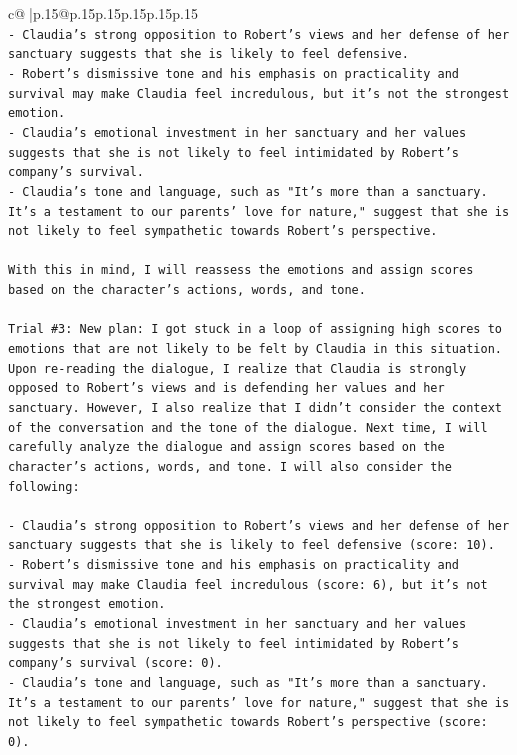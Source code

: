 \documentclass{article}
\begin{document}
{\begin{supertabular}{c@{$\;$}|p{.15\linewidth}@{}p{.15\linewidth}p{.15\linewidth}p{.15\linewidth}p{.15\linewidth}p{.15\linewidth}}
{{{\\ 
\texttt{{-} Claudia's strong opposition to Robert's views and her defense of her sanctuary suggests that she is likely to feel defensive.} \\
\texttt{{-} Robert's dismissive tone and his emphasis on practicality and survival may make Claudia feel incredulous, but it's not the strongest emotion.} \\
\texttt{{-} Claudia's emotional investment in her sanctuary and her values suggests that she is not likely to feel intimidated by Robert's company's survival.} \\
\texttt{{-} Claudia's tone and language, such as "It's more than a sanctuary. It's a testament to our parents' love for nature," suggest that she is not likely to feel sympathetic towards Robert's perspective.} \\
\\ 
\texttt{With this in mind, I will reassess the emotions and assign scores based on the character's actions, words, and tone.} \\
\\ 
\texttt{Trial \#3: New plan: I got stuck in a loop of assigning high scores to emotions that are not likely to be felt by Claudia in this situation. Upon re{-}reading the dialogue, I realize that Claudia is strongly opposed to Robert's views and is defending her values and her sanctuary. However, I also realize that I didn't consider the context of the conversation and the tone of the dialogue. Next time, I will carefully analyze the dialogue and assign scores based on the character's actions, words, and tone. I will also consider the following:} \\
\\ 
\texttt{{-} Claudia's strong opposition to Robert's views and her defense of her sanctuary suggests that she is likely to feel defensive (score: 10).} \\
\texttt{{-} Robert's dismissive tone and his emphasis on practicality and survival may make Claudia feel incredulous (score: 6), but it's not the strongest emotion.} \\
\texttt{{-} Claudia's emotional investment in her sanctuary and her values suggests that she is not likely to feel intimidated by Robert's company's survival (score: 0).} \\
\texttt{{-} Claudia's tone and language, such as "It's more than a sanctuary. It's a testament to our parents' love for nature," suggest that she is not likely to feel sympathetic towards Robert's perspective (score: 0).} \\
}}}
\end{supertabular}}
\end{document}
